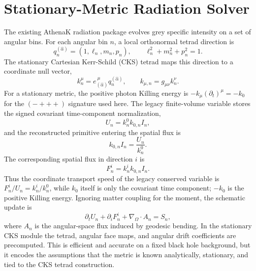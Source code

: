 \documentclass[11pt]{article}
\newcommand{\I}{I}
\begin{document}
\section{Stationary-Metric Radiation Solver}
\label{sec:legacy}

The existing AthenaK radiation package evolves grey specific intensity on a set
of angular bins.  For each angular bin \(n\), a local orthonormal tetrad
direction is
\begin{equation}
  q^{(\hat{\alpha})}_n = (1,\ell_n,m_n,p_n), \qquad
  \ell_n^2 + m_n^2 + p_n^2 = 1 .
\end{equation}
The stationary Cartesian Kerr-Schild (CKS) tetrad maps this direction to a
coordinate null vector,
\begin{equation}
  k^\mu_n = e_{(\hat{\alpha})}^{\ \mu} q^{(\hat{\alpha})}_n,
  \qquad
  k_{\mu,n}=g_{\mu\nu}k^\nu_n .
\end{equation}
For a stationary metric, the positive photon Killing energy is
\(-k_\mu(\partial_t)^\mu=-k_0\) for the \((-+++)\) signature used here.  The
legacy finite-volume variable stores the signed covariant time-component
normalization,
\begin{equation}
  U_n = k^0_n k_{0,n}\I_n ,
  \label{eq:legacyU}
\end{equation}
and the reconstructed primitive entering the spatial flux is
\begin{equation}
  k_{0,n}\I_n = \frac{U_n}{k^0_n}.
\end{equation}
The corresponding spatial flux in direction \(i\) is
\begin{equation}
  F^i_n = k^i_n k_{0,n}\I_n .
  \label{eq:legacy_flux}
\end{equation}
Thus the coordinate transport speed of the legacy conserved variable is
\(F^i_n/U_n=k^i_n/k^0_n\), while \(k_0\) itself is only the covariant time
component; \(-k_0\) is the positive Killing energy.
Ignoring matter coupling for the moment, the schematic update is
\begin{equation}
  \partial_t U_n + \partial_i F^i_n
  + \nabla_\Omega\cdot A_n = S_n ,
  \label{eq:legacy_update}
\end{equation}
where \(A_n\) is the angular-space flux induced by geodesic bending.  In the
stationary CKS module the tetrad, angular face maps, and angular drift
coefficients are precomputed.  This is efficient and accurate on a fixed black
hole background, but it encodes the assumptions that the metric is known
analytically, stationary, and tied to the CKS tetrad construction.
\end{document}
